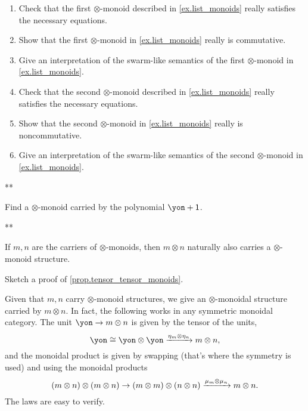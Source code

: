 \documentclass[Book-Poly]{subfiles}
\begin{document}
\begin{exercise}\label{exc.list_monoids}
\begin{enumerate}
	\item Check that the first $\otimes$-monoid described in \cref{ex.list_monoids} really satisfies the necessary equations.
	\item Show that the first $\otimes$-monoid in \cref{ex.list_monoids} really is commutative.
	\item Give an interpretation of the swarm-like semantics of the first $\otimes$-monoid in \cref{ex.list_monoids}.
	\item Check that the second $\otimes$-monoid described in \cref{ex.list_monoids} really satisfies the necessary equations.
	\item Show that the second $\otimes$-monoid in \cref{ex.list_monoids} really is noncommutative.
	\item Give an interpretation of the swarm-like semantics of the second $\otimes$-monoid in \cref{ex.list_monoids}.
\qedhere
\end{enumerate}
\begin{solution}
**
\end{solution}
\end{exercise}

\begin{exercise}
Find a $\otimes$-monoid carried by the polynomial $\yon+\1$.
\begin{solution}
**
\end{solution}
\end{exercise}

\begin{proposition}\label{prop.tensor_tensor_monoids}
If $m,n$ are the carriers of $\otimes$-monoids, then $m\otimes n$ naturally also carries a $\otimes$-monoid structure.
\end{proposition}

\begin{exercise}
Sketch a proof of \cref{prop.tensor_tensor_monoids}.
\begin{solution}
Given that $m, n$ carry $\otimes$-monoid structures, we give an $\otimes$-monoidal structure carried by $m\otimes n$.
In fact, the following works in any symmetric monoidal category.
The unit $\yon\to m\otimes n$ is given by the tensor of the units,
\[\yon\cong\yon\otimes\yon\To{\eta_m\otimes\eta_n}m\otimes n,\]
and the monoidal product is given by swapping (that's where the symmetry is used) and using the monoidal products
\[
(m\otimes n)\otimes(m\otimes n)\to (m\otimes m)\otimes(n\otimes n)\xrightarrow{\mu_m\otimes\mu_n}m\otimes n.
\]
The laws are easy to verify.
\end{solution}
\end{exercise}
\end{document}
